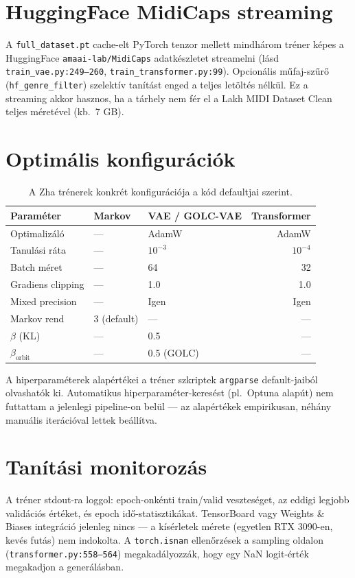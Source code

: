 \section{HuggingFace MidiCaps streaming}

A \texttt{full\_dataset.pt} cache-elt PyTorch tenzor mellett mindhárom tréner képes a HuggingFace \texttt{amaai-lab/MidiCaps} adatkészletet streamelni (lásd \texttt{train\_vae.py:249--260}, \texttt{train\_transformer.py:99}). Opcionális műfaj-szűrő (\texttt{hf\_genre\_filter}) szelektív tanítást enged a teljes letöltés nélkül. Ez a streaming akkor hasznos, ha a tárhely nem fér el a Lakh MIDI Dataset Clean teljes méretével (kb.\ 7 GB).

\section{Optimális konfigurációk}

\begin{table}[h]
\centering
\begin{tabular}{lllr}
\toprule
Paraméter & Markov & VAE / GOLC-VAE & Transformer \\
\midrule
Optimalizáló & --- & AdamW & AdamW \\
Tanulási ráta & --- & $10^{-3}$ & $10^{-4}$ \\
Batch méret & --- & 64 & 32 \\
Gradiens clipping & --- & 1.0 & 1.0 \\
Mixed precision & --- & Igen & Igen \\
Markov rend & 3 (default) & --- & --- \\
$\beta$ (KL) & --- & 0.5 & --- \\
$\beta_{\text{orbit}}$ & --- & 0.5 (GOLC) & --- \\
\bottomrule
\end{tabular}
\caption{A Zha trénerek konkrét konfigurációja a kód defaultjai szerint.}
\label{tab:optimal_hyperparams}
\end{table}

A hiperparaméterek alapértékei a tréner szkriptek \texttt{argparse} default-jaiból olvashatók ki. Automatikus hiperparaméter-keresést (pl.\ Optuna alapút) nem futtattam a jelenlegi pipeline-on belül --- az alapértékek empirikusan, néhány manuális iterációval lettek beállítva.

\section{Tanítási monitorozás}

A tréner stdout-ra loggol: epoch-onkénti train/valid veszteséget, az eddigi legjobb validációs értéket, és epoch idő-statisztikákat. TensorBoard vagy Weights \& Biases integráció jelenleg nincs --- a kísérletek mérete (egyetlen RTX 3090-en, kevés futás) nem indokolta. A \texttt{torch.isnan} ellenőrzések a sampling oldalon (\texttt{transformer.py:558--564}) megakadályozzák, hogy egy NaN logit-érték megakadjon a generálásban.
